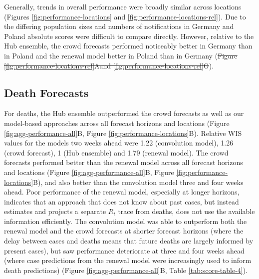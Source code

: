 \documentclass[
]{article}
\providecommand{\DIFaddtex}[1]{{\protect\color{blue}\uwave{#1}}} %
\providecommand{\DIFdeltex}[1]{{\protect\color{red}\sout{#1}}}                      %
\providecommand{\DIFaddbegin}{} %
\providecommand{\DIFaddend}{} %
\providecommand{\DIFdelbegin}{} %
\providecommand{\DIFdelend}{} %
\providecommand{\DIFadd}[1]{\texorpdfstring{\DIFaddtex{#1}}{#1}} %
\providecommand{\DIFdel}[1]{\texorpdfstring{\DIFdeltex{#1}}{}} %
\newcommand{\DIFscaledelfig}{0.5}
\newlength{\DIFdelgraphicswidth} %
\newlength{\DIFdelgraphicsheight} %
\newcommand{\DIFaddincludegraphics}[2][]{{\color{blue}\fbox{\DIFOincludegraphics[#1]{#2}}}} %
\newcommand{\DIFdelincludegraphics}[2][]{%
\sbox{\DIFdelgraphicsbox}{\DIFOincludegraphics[#1]{#2}}%
\settoboxwidth{\DIFdelgraphicswidth}{\DIFdelgraphicsbox} %
\settoboxtotalheight{\DIFdelgraphicsheight}{\DIFdelgraphicsbox} %
\scalebox{\DIFscaledelfig}{%
\parbox[b]{\DIFdelgraphicswidth}{\usebox{\DIFdelgraphicsbox}\\[-\baselineskip] \rule{\DIFdelgraphicswidth}{0em}}\llap{\resizebox{\DIFdelgraphicswidth}{\DIFdelgraphicsheight}{%
\setlength{\unitlength}{\DIFdelgraphicswidth}%
\begin{picture}(1,1)%
\thicklines\linethickness{2pt} %
{\color[rgb]{1,0,0}\put(0,0){\framebox(1,1){}}}%
{\color[rgb]{1,0,0}\put(0,0){\line( 1,1){1}}}%
{\color[rgb]{1,0,0}\put(0,1){\line(1,-1){1}}}%
\end{picture}%
}\hspace*{3pt}}} %
} %
\DeclareRobustCommand{\DIFaddbegin}{\DIFOaddbegin \let\includegraphics\DIFaddincludegraphics} %
\DeclareRobustCommand{\DIFaddend}{\DIFOaddend \let\includegraphics\DIFOincludegraphics} %
\DeclareRobustCommand{\DIFdelbegin}{\DIFOdelbegin \let\includegraphics\DIFdelincludegraphics} %
\DeclareRobustCommand{\DIFdelend}{\DIFOaddend \let\includegraphics\DIFOincludegraphics} %
\begin{document}
Generally, trends in overall performance were broadly similar across locations (Figures \ref{fig:performance-locations} and \ref{fig:performance-locations-rel}).
Due to the differing population sizes and numbers of notifications in Germany and Poland absolute scores were difficult to compare directly. However, relative to the Hub ensemble, the crowd forecasts performed noticeably better in Germany than in Poland and the renewal model better in Poland than in Germany (\DIFdelbegin \DIFdel{Figure \ref{fig:performance-locations-rel}Aand \ref{fig:performance-locations-rel}G}\DIFdelend \DIFaddbegin \DIFadd{Figures \ref{fig:performance-locations-rel}A, \ref{fig:performance-locations-rel}G, \ref{fig:agg-performance-all-Germany}, \ref{fig:agg-performance-all-Poland}}\DIFaddend ).

\hypertarget{death-forecasts}{%
\subsection{Death Forecasts}\label{death-forecasts}}

For deaths, the Hub ensemble outperformed the crowd forecasts as well as our model-based approaches across all forecast horizons and locations (Figure \ref{fig:agg-performance-all}B, Figure \ref{fig:performance-locations}B). Relative WIS values for the models two weeks ahead were 1.22 (convolution model), 1.26 (crowd forecast), 1 (Hub ensemble) and 1.79 (renewal model). The crowd forecasts performed better than the renewal model across all forecast horizons and locations (Figure \ref{fig:agg-performance-all}B, Figure \ref{fig:performance-locations}B), and also better than the convolution model three and four weeks ahead. Poor performance of the renewal model, especially at longer horizons, indicates that an approach that does not know about past cases, but instead estimates and projects a separate \(R_t\) trace from deaths, does not use the available information efficiently. The convolution model was able to outperform both the renewal model and the crowd forecasts at shorter forecast horizons (where the delay between cases and deaths means that future deaths are largely informed by present cases), but saw performance deteriorate at three and four weeks ahead (where case predictions from the renewal model were increasingly used to inform death predictions) (Figure \ref{fig:agg-performance-all}B, Table \ref{tab:score-table-4}).
\end{document}
